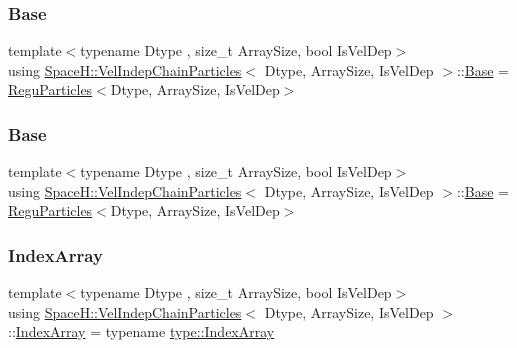 \subsubsection{\texorpdfstring{Base}{Base}\hspace{0.1cm}{\footnotesize\ttfamily [1/2]}}
{\footnotesize\ttfamily template$<$typename Dtype , size\+\_\+t Array\+Size, bool Is\+Vel\+Dep$>$ \\
using \mbox{\hyperlink{class_space_h_1_1_vel_indep_chain_particles}{Space\+H\+::\+Vel\+Indep\+Chain\+Particles}}$<$ Dtype, Array\+Size, Is\+Vel\+Dep $>$\+::\mbox{\hyperlink{class_space_h_1_1_vel_indep_chain_particles_a071fb842f4ccb3ff01015c1105302e8a}{Base}} =  \mbox{\hyperlink{class_space_h_1_1_regu_particles}{Regu\+Particles}}$<$Dtype, Array\+Size, Is\+Vel\+Dep$>$}

\mbox{\label{class_space_h_1_1_vel_indep_chain_particles_a071fb842f4ccb3ff01015c1105302e8a}} 
\subsubsection{\texorpdfstring{Base}{Base}\hspace{0.1cm}{\footnotesize\ttfamily [2/2]}}
{\footnotesize\ttfamily template$<$typename Dtype , size\+\_\+t Array\+Size, bool Is\+Vel\+Dep$>$ \\
using \mbox{\hyperlink{class_space_h_1_1_vel_indep_chain_particles}{Space\+H\+::\+Vel\+Indep\+Chain\+Particles}}$<$ Dtype, Array\+Size, Is\+Vel\+Dep $>$\+::\mbox{\hyperlink{class_space_h_1_1_vel_indep_chain_particles_a071fb842f4ccb3ff01015c1105302e8a}{Base}} =  \mbox{\hyperlink{class_space_h_1_1_regu_particles}{Regu\+Particles}}$<$Dtype, Array\+Size, Is\+Vel\+Dep$>$}

\mbox{\label{class_space_h_1_1_vel_indep_chain_particles_a48b9183f8d68fe8af42bf405125d450c}} 
\subsubsection{\texorpdfstring{Index\+Array}{IndexArray}\hspace{0.1cm}{\footnotesize\ttfamily [1/2]}}
{\footnotesize\ttfamily template$<$typename Dtype , size\+\_\+t Array\+Size, bool Is\+Vel\+Dep$>$ \\
using \mbox{\hyperlink{class_space_h_1_1_vel_indep_chain_particles}{Space\+H\+::\+Vel\+Indep\+Chain\+Particles}}$<$ Dtype, Array\+Size, Is\+Vel\+Dep $>$\+::\mbox{\hyperlink{class_space_h_1_1_vel_indep_chain_particles_a48b9183f8d68fe8af42bf405125d450c}{Index\+Array}} =  typename \mbox{\hyperlink{struct_space_h_1_1_proto_type_a276a37c81faf08681b57e8082f3f6c1b}{type\+::\+Index\+Array}}}


